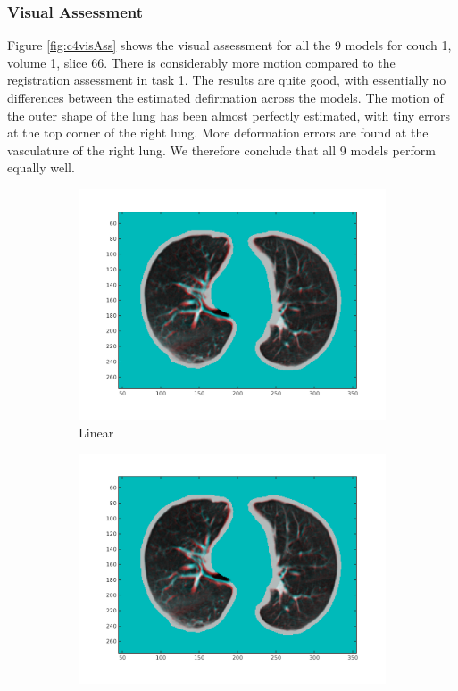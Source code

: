 \documentclass[11pt,a4paper,oneside]{report}
\begin{document}
\subsubsection*{Visual Assessment}

Figure \ref{fig:c4visAss} shows the visual assessment for all the 9 models for couch 1, volume 1, slice 66. There is considerably more motion compared to the registration assessment in task 1. The results are quite good, with essentially no differences between the estimated defirmation across the models. The motion of the outer shape of the lung has been almost perfectly estimated, with tiny errors at the top corner of the right lung. More deformation errors are found at the vasculature of the right lung. We therefore conclude that all 9 models perform equally well.

\begin{figure}[H]
  \centering
  \hspace*{-2em}
  \begin{subfigure}[b]{0.33\textwidth}
    \includegraphics[width=\textwidth, trim=0 50 0 0,clip=true]{figures/task4/visAss_m1.png}
    \caption{Linear}
  \end{subfigure}%
  \begin{subfigure}[b]{0.33\textwidth}
    \includegraphics[width=\textwidth, trim=0 50 0 0,clip=true]{figures/task4/visAss_m1.png}

\end{subfigure}
\end{figure}
\end{document}
